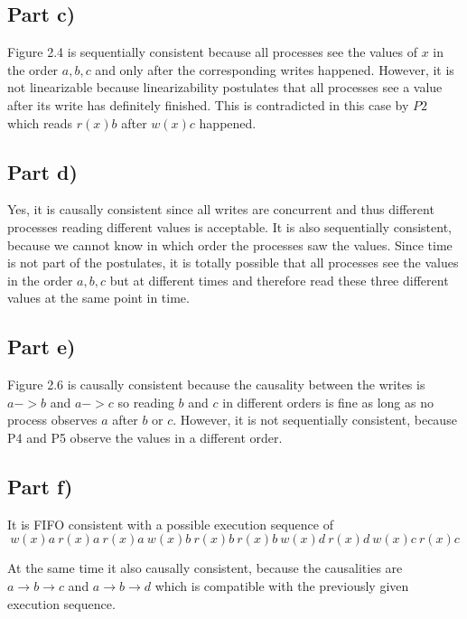 \documentclass[10pt,a4paper]{article}
\begin{document}
\subsection*{Part c)}

Figure 2.4 is sequentially consistent because all processes see the values of $x$ in the order $a, b, c$ and only after the corresponding writes happened.
However, it is not linearizable because linearizability postulates that all processes see a value after its write has definitely finished.
This is contradicted in this case by $P2$ which reads $r(x)b$ after $w(x)c$ happened.

\subsection*{Part d)}

Yes, it is causally consistent since all writes are concurrent and thus different processes reading different values is acceptable.
It is also sequentially consistent, because we cannot know in which order the processes saw the values.
Since time is not part of the postulates, it is totally possible that all processes see the values in the order $a, b, c$ but at different times and therefore read these three different values at the same point in time.

\subsection*{Part e)}

Figure 2.6 is causally consistent because the causality between the writes is $a -> b$ and $a -> c$ so reading $b$ and $c$ in different orders is fine as long as no process observes $a$ after $b$ or $c$.
However, it is not sequentially consistent, because P4 and P5 observe the values in a different order.

\subsection*{Part f)}

It is FIFO consistent with a possible execution sequence of
\begin{equation*}
w(x)a\ r(x)a\ r(x)a\ w(x)b\ r(x)b\ r(x)b\ w(x)d\ r(x)d\ w(x)c\ r(x)c
\end{equation*}

At the same time it also causally consistent, because the causalities are $a \rightarrow b \rightarrow c$ and $a \rightarrow b \rightarrow d$ which is compatible with the previously given execution sequence.
\end{document}
